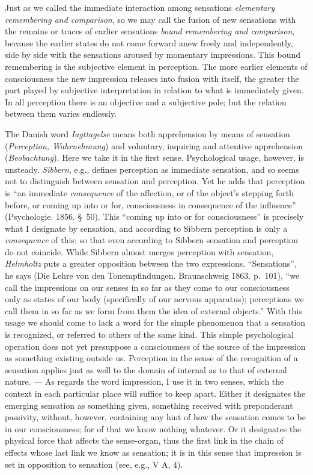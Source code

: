 \documentclass[12pt,a4paper]{book}
\newcommand{\opage}[1]{\marginnote{\footnotesize\textit{[#1]}}}
\begin{document}
Just as we called the immediate interaction among sensations
\emph{elementary remembering and comparison}, so we may call the fusion of
new sensations with the remains or traces of earlier sensations
\emph{bound remembering and comparison}, because the earlier states do not
come forward anew freely and independently, side by side with the
sensations aroused by momentary impressions. This bound remembering is the
subjective element in perception. The more earlier elements of
consciousness the new impression releases into fusion with itself, the
greater the part played by subjective interpretation in relation to what
is immediately given. In all perception there is an objective and a
subjective pole; but the relation between them varies endlessly.


\opage{154}The Danish word \textit{Iagttagelse} means both apprehension by
means of sensation (\textit{Perception, Wahrnehmung}) and voluntary,
inquiring and attentive apprehension (\textit{Beobachtung}). Here we take
it in the first sense. Psychological usage, however, is unsteady.
\emph{Sibbern}, e.g., defines perception as immediate sensation, and so
seems not to distinguish between sensation and perception. Yet he adds that
perception is ``an immediate \emph{consequence} of the affection, or of
the object's stepping forth before, or coming up into or for,
consciousness in consequence of the influence'' (Psychologie. 1856.
\S~50). This ``coming up into or for consciousness'' is precisely what I
designate by sensation, and according to Sibbern perception is only a
\emph{consequence} of this; so that even according to Sibbern sensation and
perception do not coincide. While Sibbern almost merges perception with
sensation, \emph{Helmholtz} puts a greater opposition between the two
expressions. ``Sensations'', he says (Die Lehre von den Tonempfindungen.
Braunschweig 1863. p.~101), ``we call the impressions on our senses in so
far as they come to our consciousness only as states of our body
(specifically of our nervous apparatus); perceptions we call them in so
far as we form from them the idea of external objects.'' With this usage we
should come to lack a word for the simple phenomenon that a sensation is
recognized, or referred to others of the same kind. This simple
psychological operation does not yet presuppose a consciousness of the
source of the impression as something existing outside us. Perception in
the sense of the recognition of a sensation applies just as well to the
domain of internal as to that of external nature. --- As regards the word
impression, I use it in two senses, which the context in each particular
place will suffice to keep apart. Either it designates the emerging
sensation as something given, something received with preponderant
passivity, without, however, containing any hint of how the sensation
comes to be in our consciousness; for of that we know nothing whatever. Or
it designates the physical force that affects the sense-organ, thus the
first link in the chain of effects whose last link we know as
\opage{155}sensation; it is in this sense that impression is set in
opposition to sensation (see, e.g., V A, 4).
\end{document}
